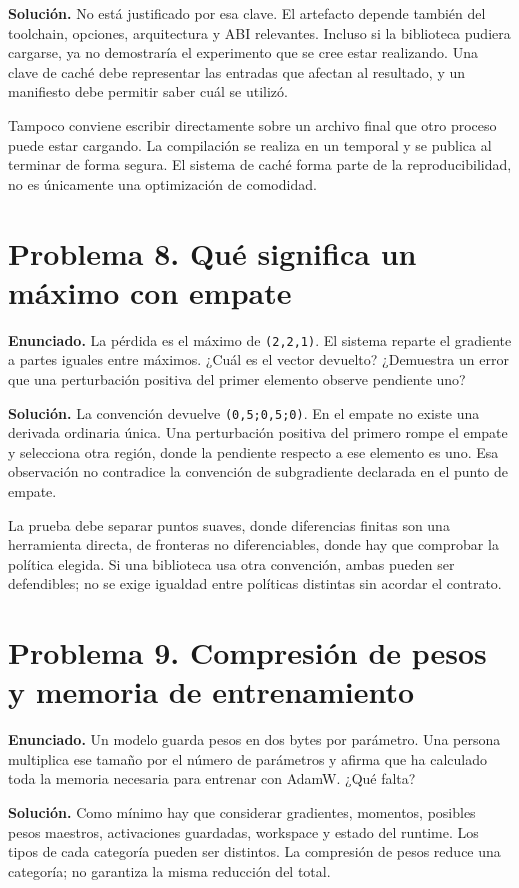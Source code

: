 \documentclass[12pt,a4paper,oneside]{report}
\begin{document}
\textbf{Solución.} No está justificado por esa clave. El artefacto depende también del toolchain, opciones, arquitectura y ABI relevantes. Incluso si la biblioteca pudiera cargarse, ya no demostraría el experimento que se cree estar realizando. Una clave de caché debe representar las entradas que afectan al resultado, y un manifiesto debe permitir saber cuál se utilizó.

Tampoco conviene escribir directamente sobre un archivo final que otro proceso puede estar cargando. La compilación se realiza en un temporal y se publica al terminar de forma segura. El sistema de caché forma parte de la reproducibilidad, no es únicamente una optimización de comodidad.

\section{Problema 8. Qué significa un máximo con empate}
\textbf{Enunciado.} La pérdida es el máximo de \texttt{(2,2,1)}. El sistema reparte el gradiente a partes iguales entre máximos. ¿Cuál es el vector devuelto? ¿Demuestra un error que una perturbación positiva del primer elemento observe pendiente uno?

\textbf{Solución.} La convención devuelve \texttt{(0,5;0,5;0)}. En el empate no existe una derivada ordinaria única. Una perturbación positiva del primero rompe el empate y selecciona otra región, donde la pendiente respecto a ese elemento es uno. Esa observación no contradice la convención de subgradiente declarada en el punto de empate.

La prueba debe separar puntos suaves, donde diferencias finitas son una herramienta directa, de fronteras no diferenciables, donde hay que comprobar la política elegida. Si una biblioteca usa otra convención, ambas pueden ser defendibles; no se exige igualdad entre políticas distintas sin acordar el contrato.

\section{Problema 9. Compresión de pesos y memoria de entrenamiento}
\textbf{Enunciado.} Un modelo guarda pesos en dos bytes por parámetro. Una persona multiplica ese tamaño por el número de parámetros y afirma que ha calculado toda la memoria necesaria para entrenar con AdamW. ¿Qué falta?

\textbf{Solución.} Como mínimo hay que considerar gradientes, momentos, posibles pesos maestros, activaciones guardadas, workspace y estado del runtime. Los tipos de cada categoría pueden ser distintos. La compresión de pesos reduce una categoría; no garantiza la misma reducción del total.
\end{document}
